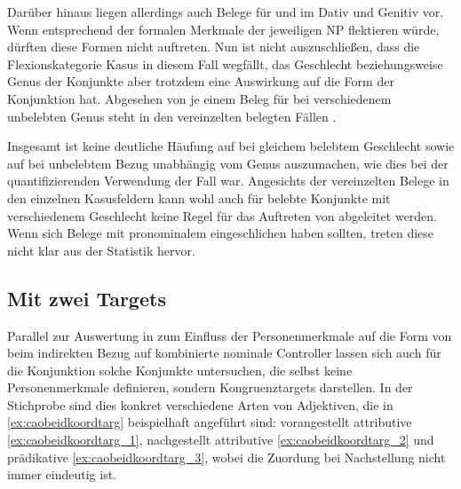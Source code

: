 Darüber hinaus liegen allerdings auch Belege für  und 
im Dativ und Genitiv vor. Wenn  entsprechend der formalen
Merkmale der jeweiligen NP flektieren würde, dürften diese Formen nicht
auftreten. Nun ist nicht auszuschließen, dass die Flexionskategorie Kasus in
diesem Fall wegfällt, das Geschlecht beziehungsweise Genus der Konjunkte aber
trotzdem eine Auswirkung auf die Form der Konjunktion hat. Abgesehen von je
einem Beleg für  bei verschiedenem unbelebten Genus steht in den
vereinzelten belegten Fällen .

Insgesamt ist keine deutliche Häufung auf  bei gleichem belebtem
Geschlecht sowie auf  bei unbelebtem Bezug unabhängig vom Genus
auszumachen, wie dies bei der quantifizierenden Verwendung der Fall war.
Angesichts der vereinzelten Belege in den einzelnen Kasusfeldern kann wohl auch
für belebte Konjunkte mit verschiedenem Geschlecht keine Regel für das
Auftreten von  abgeleitet werden. Wenn sich Belege mit
pronominalem  eingeschlichen haben sollten, treten diese nicht klar
aus der Statistik hervor.

\subsection{Mit zwei Targets}
\label{subsec:caobeidkoordtarg}

Parallel zur Auswertung in  zum Einfluss der
Personenmerkmale auf die Form von  beim indirekten Bezug auf
kombinierte nominale Controller lassen sich auch für die Konjunktion
 solche Konjunkte untersuchen, die selbst keine Personenmerkmale
definieren, sondern Kongruenz\-targets darstellen. In der Stichprobe sind dies
konkret verschiedene Arten von Adjektiven, die in \cref{ex:caobeidkoordtarg}
beispielhaft angeführt sind: vorangestellt attributive
\cref{ex:caobeidkoordtarg_1}, nachgestellt attributive
\cref{ex:caobeidkoordtarg_2} und prädikative \cref{ex:caobeidkoordtarg_3},
wobei die Zuordung bei Nachstellung nicht immer eindeutig ist.


